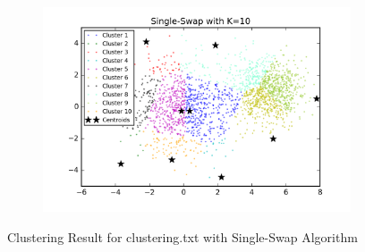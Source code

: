 \begin{figure}[htb]
\begin{subfigure}[b]{0.475\textwidth}
            \includegraphics[width=\textwidth]{./figures/clustering_singleSwap_10.png}
        \end{subfigure}
        
        \caption{Clustering Result for clustering.txt with Single-Swap Algorithm}
        \label{fig:kmean_clustering}
\end{figure}

